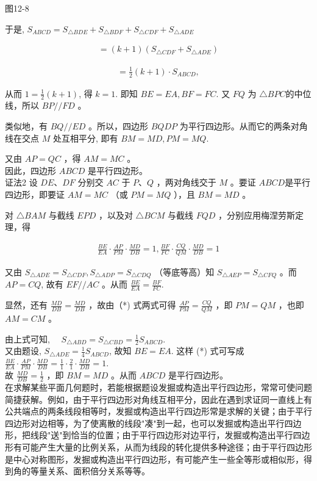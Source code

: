 \documentclass[10pt]{article}
\begin{document}
图12-8

于是, $S_{A B C D}=S_{\triangle B D E}+S_{\triangle B D F}+S_{\triangle C D F}+S_{\triangle A D E}$

\begin{align*}
=(k+1)\left(S_{\triangle C D F}+S_{\triangle A D E}\right)
\end{align*}

\begin{align*}
=\frac{1}{2}(k+1) \cdot S_{A B C D},
\end{align*}

从而 $1=\frac{1}{2}(k+1)$, 得 $k=1$. 即知 $B E=E A, B F=F C$. 又 $F Q$ 为 $\triangle B P C$的中位线，所以 $B P / / F D$ 。

类似地，有 $B Q / / E D$ 。所以，四边形 $B Q D P$ 为平行四边形。从而它的两条对角线在交点 $M$ 处互相平分, 即有 $B M=M D, P M=M Q$.

又由 $A P=Q C$ ，得 $A M=M C$ 。\\
因此，四边形 $A B C D$ 是平行四边形。\\
证法2 设 $D E 、 D F$ 分别交 $A C$ 于 $P 、 Q$ ，两对角线交于 $M$ 。要证 $A B C D$是平行四边形，即要证 $A M=M C$ （或 $P M=M Q$ ），且 $B M=M D$ 。

对 $\triangle B A M$ 与截线 $E P D$ ，以及对 $\triangle B C M$ 与截线 $F Q D$ ，分别应用梅涅劳斯定理，得

\begin{align*}
\frac{B E}{E A} \cdot \frac{A P}{P M} \cdot \frac{M D}{D B}=1, \frac{B F}{F C} \cdot \frac{C Q}{Q M} \cdot \frac{M D}{D B}=1 \tag{*}
\end{align*}

又由 $S_{\triangle A D E}=S_{\triangle C D F}, S_{\triangle A D P}=S_{\triangle C D Q}$ （等底等高）知 $S_{\triangle A E P}=S_{\triangle C F Q}$ 。而 $A P=C Q$, 故有 $E F / / A C$ 。从而 $\frac{B E}{E A}=\frac{B F}{F C}$.

显然，还有 $\frac{M D}{D B}=\frac{M D}{D B}$ ，故由（*) 式两式可得 $\frac{A P}{P M}=\frac{C Q}{Q M}$ ，即 $P M=Q M$ ，也即 $A M=C M$ 。

由上式可知, $\quad S_{\triangle A B D}=S_{\triangle C B D}=\frac{1}{2} S_{A B C D}$.\\
又由题设, $S_{\triangle A D E}=\frac{1}{4} S_{A B C D}$, 故知 $B E=E A$. 这样 (*) 式可写成\\
$\frac{B E}{E A} \cdot \frac{A P}{P M} \cdot \frac{M D}{D B}=\frac{1}{1} \cdot \frac{2}{1} \cdot \frac{M D}{D B}=1$.\\
故 $\frac{M D}{D B}=\frac{1}{2}$ ，即 $B M=M D$ 。从而 $A B C D$ 是平行四边形。\\
在求解某些平面几何题时，若能根据题设发掘或构造出平行四边形，常常可使问题简捷获解。例如，由于平行四边形对角线互相平分，因此在遇到求证同一直线上有公共端点的两条线段相等时，发掘或构造出平行四边形常是求解的关键；由于平行四边形对边相等，为了使离散的线段"凑"到一起，也可以发掘或构造出平行四边形，把线段"送"到恰当的位置；由于平行四边形对边平行，发掘或构造出平行四边形有可能产生大量的比例关系，从而为线段的转化提供多种途径；由于平行四边形是中心对称图形，发掘或构造出平行四边形，有可能产生一些全等形或相似形，得到角的等量关系、面积倍分关系等等。
\end{document}
